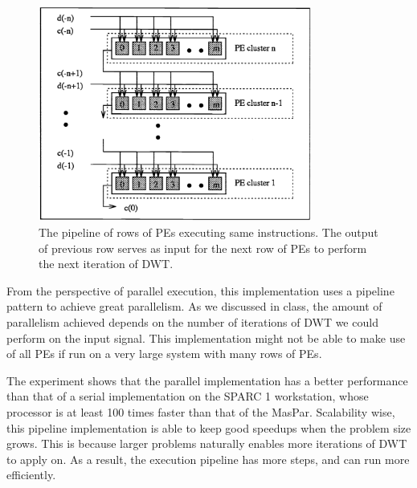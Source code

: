 \begin{figure}
    \centering
    \includegraphics[width=0.8\textwidth]{fig/simd2.png}
    \caption{The pipeline of rows of PEs executing same instructions.
             The output of previous row serves as input for the next row
             of PEs to perform the next iteration of DWT.}
    \label{fig:simd2}
\end{figure}


From the perspective of parallel execution, this implementation uses
a pipeline pattern to achieve great parallelism.
%
As we discussed in class, the amount of parallelism achieved depends on
the number of iterations of DWT we could perform on the input signal.
%
This implementation might not be able to make use of all PEs if run on 
a very large system with many rows of PEs.


The experiment shows that the parallel implementation has a better 
performance than that of a serial implementation on the SPARC 1 workstation,
whose processor is at least 100 times faster than that of the MasPar.
%
Scalability wise, this pipeline implementation is able to keep good speedups
when the problem size grows.
%
This is because larger problems naturally enables more iterations of DWT
to apply on.
%
As a result, the execution pipeline has more steps, and can run more efficiently.
